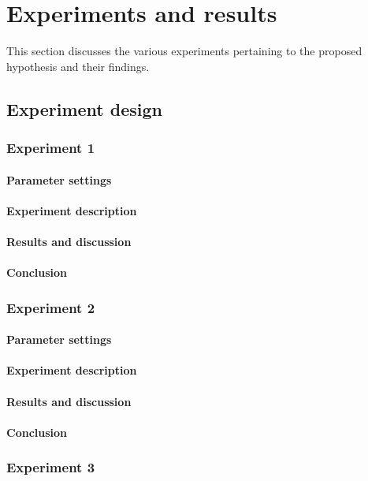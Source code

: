 \chapter{Experiments and results}
This section discusses the various experiments pertaining to the proposed hypothesis and their findings. 
\section{Experiment design}
\subsection{Experiment 1}
\subsubsection{Parameter settings}
\subsubsection{Experiment description}
\subsubsection{Results and discussion}
\subsubsection{Conclusion}

\subsection{Experiment 2}
\subsubsection{Parameter settings}
\subsubsection{Experiment description}
\subsubsection{Results and discussion}
\subsubsection{Conclusion}

\subsection{Experiment 3}
